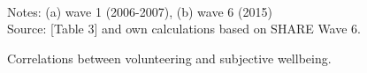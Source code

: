 \documentclass[10pt, letterpaper]{article}
\begin{document}
\begin{spacing}{1.4}
\begin{figure}[H]
\centering
\caption{Correlations between volunteering and subjective wellbeing.}  
\label{fig:taub}
\begin{minipage}{1\linewidth}
\quad
{}~\\
{\footnotesize Notes: (a) wave 1 (2006-2007), (b) wave 6 (2015) }~\\
{\footnotesize Source: \citet{haski09} [Table 3] and own calculations based on SHARE Wave 6.}
\end{minipage}
\end{figure} 

%



\end{spacing}
\end{document}
